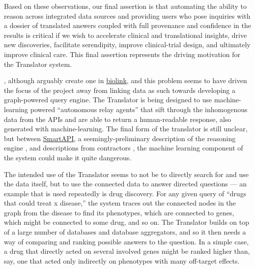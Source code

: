 \documentclass[10pt]{article}
\begin{document}
\begin{multicols}{2}
{\begin{leftbar}
  Based on these observations, our final assertion is that automating
  the ability to reason across integrated data sources and providing
  users who pose inquiries with a dossier of translated answers coupled
  with full provenance and confidence in the results is critical if we
  wish to accelerate clinical and translational insights, drive new
  discoveries, facilitate serendipity, improve clinical-trial design,
  and ultimately improve clinical care. This final assertion represents
  the driving motivation for the Translator system. \cite{consortiumUniversalBiomedicalData2019} 
  \end{leftbar}}\cite{consortiumUniversalBiomedicalData2019} ,
although arguably create one in
\href{https://biolink.github.io/biolink-model/docs/}{biolink}, and this
problem seems to have driven the focus of the project away from linking
data as such towards developing a graph-powered query engine. The
Translator is being designed to use machine-learning powered
``autonomous relay agents'' that sift through the inhomogenous data from
the APIs and are able to return a human-readable response, also
generated with machine-learning. The final form of the translator is
still unclear, but between
\href{https://smart-api.info/portal/translator}{SmartAPI}, a
seemingly-preliminary description of the reasoning engine \cite{goelExplanationContainerCaseBased2021} , and descriptions from
contractors \cite{ROBOKOPCoVar2021} , the machine learning
component of the system could make it quite dangerous.

The intended use of the Translator seems to not be to directly search
for and use the data itself, but to use the connected data to answer
directed questions \cite{goelExplanationContainerCaseBased2021} 
--- an example that is used repeatedly is drug discovery. For any given
query of ``drugs that could treat x disease,'' the system traces out the
connected nodes in the graph from the disease to find its phenotypes,
which are connected to genes, which might be connected to some drug, and
so on. The Translator builds on top of a large number of databases and
database aggregators, and so it then needs a way of comparing and
ranking possible answers to the question. In a simple case, a drug that
directly acted on several involved genes might be ranked higher than,
say, one that acted only indirectly on phenotypes with many off-target
effects.


\end{multicols}
\end{document}

